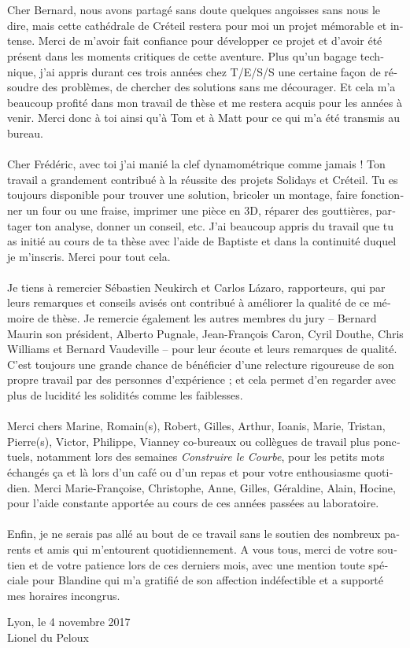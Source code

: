 \begin{otherlanguage}{french}
\\
\\
Cher Bernard, nous avons partagé sans doute quelques angoisses sans nous le dire, mais cette cathédrale de Créteil restera pour moi un projet mémorable et intense. Merci de m'avoir fait confiance pour développer ce projet et d'avoir été présent dans les moments critiques de cette aventure. Plus qu'un bagage technique, j'ai appris durant ces trois années chez T/E/S/S une certaine façon de résoudre des problèmes, de chercher des solutions sans me décourager. Et cela m'a beaucoup profité dans mon travail de thèse et me restera acquis pour les années à venir. Merci donc à toi ainsi qu'à Tom et à Matt pour ce qui m'a été transmis au bureau.
\\
\\
Cher Frédéric, avec toi j'ai manié la clef dynamométrique comme jamais ! Ton travail a grandement contribué à la réussite des projets Solidays et Créteil. Tu es toujours disponible pour trouver une solution, bricoler un montage, faire fonctionner un four ou une fraise, imprimer une pièce en 3D, réparer des gouttières, partager ton analyse, donner un conseil, etc. J'ai beaucoup appris du travail que tu as initié au cours de ta thèse avec l'aide de Baptiste et dans la continuité duquel je m'inscris. Merci pour tout cela.
\\
\\
Je tiens à remercier Sébastien Neukirch et Carlos Lázaro, rapporteurs, qui par leurs remarques et conseils avisés ont contribué à améliorer la qualité de ce mémoire de thèse. Je remercie également les autres membres du jury -- Bernard Maurin son président, Alberto Pugnale, Jean-François Caron, Cyril Douthe, Chris Williams et Bernard Vaudeville -- pour leur écoute et leurs remarques de qualité. C'est toujours une grande chance de bénéficier d'une relecture rigoureuse de son propre travail par des personnes d'expérience ; et cela permet d'en regarder avec plus de lucidité les solidités comme les faiblesses.
\\
\\
Merci chers Marine, Romain(s), Robert, Gilles, Arthur, Ioanis, Marie, Tristan, Pierre(s), Victor, Philippe, Vianney \telp{} co-bureaux ou collègues de travail plus ponctuels, notamment lors des semaines \emph{Construire le Courbe}, pour les petits mots échangés ça et là lors d'un café ou d'un repas et pour votre enthousiasme quotidien. Merci Marie-Françoise, Christophe, Anne, Gilles, Géraldine, Alain, Hocine, pour l'aide constante apportée au cours de ces années passées au laboratoire.
\\
\\
Enfin, je ne serais pas allé au bout de ce travail sans le soutien des nombreux parents et amis qui m'entourent quotidiennement. A vous tous, merci de votre soutien et de votre patience lors de ces derniers mois, avec une mention toute spéciale pour Blandine qui m'a gratifié de son affection indéfectible et a supporté mes horaires incongrus.

\bigskip
\bigskip

\begin{flushright}
Lyon, le 4 novembre 2017\\
Lionel du Peloux
\end{flushright}

\end{otherlanguage}